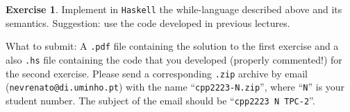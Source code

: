 \documentclass[a4paper, 11pt]{article}
\theoremstyle{definition}
\newtheorem{exercise}{Exercise}
\theoremstyle{sub}
\begin{document}
\begin{exercise}
        Implement in \texttt{Haskell} the while-language described above and
        its semantics. Suggestion: use the code developed in previous
        lectures.
\end{exercise}

\begin{mdframed}
  What to submit: A \texttt{.pdf} file containing the solution to
  the first exercise and a also \texttt{.hs} file containing the code that you developed
  (properly commented!) for the second exercise. Please send a corresponding
  \texttt{.zip} archive by email
  (\texttt{nevrenato@di.uminho.pt}) with the name
  ``\texttt{cpp2223-N.zip}'', where ``\texttt{N}'' is your student
  number.  The subject of the email should be ``\texttt{cpp2223 N
    TPC-2}''.
\end{mdframed}





\end{document}
